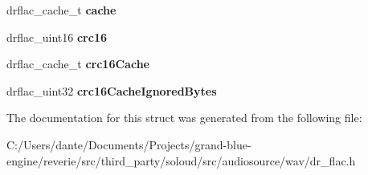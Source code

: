 \begin{DoxyCompactItemize}
drflac\+\_\+cache\+\_\+t {\bfseries cache}
\item 
\mbox{\label{structdrflac__bs_a48c014d8128684f79c5cf829d89ebf13}} 
drflac\+\_\+uint16 {\bfseries crc16}
\item 
\mbox{\label{structdrflac__bs_ad0e9287499d5286b5d9e18c53d1fcf71}} 
drflac\+\_\+cache\+\_\+t {\bfseries crc16\+Cache}
\item 
\mbox{\label{structdrflac__bs_a107f30d9f7fdb9a81054011a5c77d4b3}} 
drflac\+\_\+uint32 {\bfseries crc16\+Cache\+Ignored\+Bytes}
\end{DoxyCompactItemize}


The documentation for this struct was generated from the following file\+:\begin{DoxyCompactItemize}
\item 
C\+:/\+Users/dante/\+Documents/\+Projects/grand-\/blue-\/engine/reverie/src/third\+\_\+party/soloud/src/audiosource/wav/dr\+\_\+flac.\+h\end{DoxyCompactItemize}
